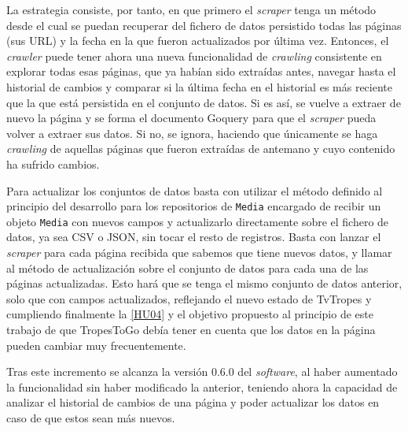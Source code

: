 La estrategia consiste, por tanto, en que primero el \textit{scraper} tenga un
método desde el cual se puedan recuperar del fichero de datos persistido todas
las páginas (sus URL) y la fecha en la que fueron actualizados por última vez.
Entonces, el \textit{crawler} puede tener ahora una nueva funcionalidad de
\textit{crawling} consistente en explorar todas esas páginas, que ya habían sido
extraídas antes, navegar hasta el historial de cambios y comparar si la última
fecha en el historial es más reciente que la que está persistida en el conjunto
de datos. Si es así, se vuelve a extraer de nuevo la página y se forma el
documento Goquery para que el \textit{scraper} pueda volver a extraer sus datos.
Si no, se ignora, haciendo que únicamente se haga \textit{crawling} de aquellas
páginas que fueron extraídas de antemano y cuyo contenido ha sufrido cambios.

Para actualizar los conjuntos de datos basta con utilizar el método definido al
principio del desarrollo para los repositorios de \texttt{Media} encargado de
recibir un objeto \texttt{Media} con nuevos campos y actualizarlo directamente
sobre el fichero de datos, ya sea CSV o JSON, sin tocar el resto de registros.
Basta con lanzar el \textit{scraper} para cada página recibida que sabemos que
tiene nuevos datos, y llamar al método de actualización sobre el conjunto de
datos para cada una de las páginas actualizadas. Esto hará que se tenga el mismo
conjunto de datos anterior, solo que con campos actualizados, reflejando el
nuevo estado de TvTropes y cumpliendo finalmente la
\href{https://github.com/jlgallego99/TropesToGo/issues/9}{[HU04]} y el objetivo
propuesto al principio de este trabajo de que TropesToGo debía tener en cuenta
que los datos en la página pueden cambiar muy frecuentemente.

Tras este incremento se alcanza la versión 0.6.0 del \textit{software}, al haber
aumentado la funcionalidad sin haber modificado la anterior, teniendo ahora la
capacidad de analizar el historial de cambios de una página y poder actualizar
los datos en caso de que estos sean más nuevos.

